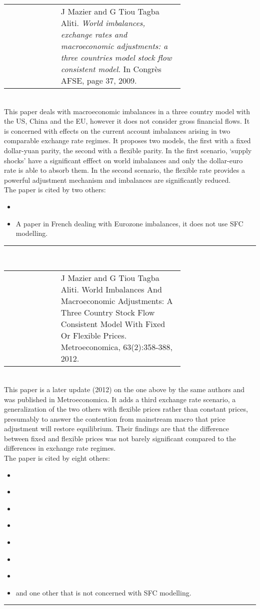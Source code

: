 \documentclass[twoside,a4paper,11pt]{article}
\begin{document}
\begin{tabular}{lp{0.7\linewidth}}
\cite{Mazier2009b} &  J Mazier and G Tiou Tagba Aliti. \textit{World imbalances, exchange
rates and macroeconomic adjustments: a three countries model stock  flow consistent model.} In Congr\`es AFSE, page 37, 2009. 
\end{tabular}\\[5pt]
This paper deals with macroeconomic imbalances in a three country model with the US, China and the EU, however it does not consider gross financial flows. It is concerned with effects on the current account imbalances arising in two comparable exchange rate regimes.  It proposes two models, the first with a fixed dollar-yuan parity, the second with a flexible parity. In the first scenario, `supply shocks' have a significant efffect on world imbalances and only the dollar-euro rate is able to absorb them. In the second scenario, the flexible rate provides a powerful adjustment mechanism and imbalances are significantly reduced.\\
The paper is cited by two others:
\begin{itemize}
\item[] \cite{Lavoie2010a}
\item[] A paper in French dealing with Eurozone imbalances, it does not use SFC modelling.
\end{itemize}
\centering \rule{5cm}{1pt} \\[1cm]

\raggedright \begin{tabular}{lp{0.7\linewidth}}
\cite{Mazier2012b} & J Mazier and G Tiou Tagba Aliti. World Imbalances And Macroeconomic Adjustments:
A Three Country Stock Flow Consistent Model With Fixed Or Flexible Prices.
Metroeconomica, 63(2):358-388, 2012.
\end{tabular}\\[5pt]
This paper is a later update (2012)  on the one above by the same authors and was published in Metroeconomica. It adds a third exchange rate scenario, a generalization of the two others with flexible prices rather than constant prices, presumably to answer the contention from mainstream macro that price adjustment will restore equilibrium. Their findings are that the difference between fixed and flexible prices was not barely significant compared to the differences in exchange rate regimes.\\
The paper is cited by eight others:
\begin{itemize}
\item[] \cite{Caverzasi2013}
\item[] \cite{Caverzasi2014a}
\item[] \cite{Benassy-Quere2013}
\item[] \cite{Mazier2015}
\item[] \cite{Kinsella2012a}
\item[] \cite{Valdecantos2015b}
\item[] \cite{Halporn2012}
\item[] and one other that is not concerned with SFC modelling.
\end{itemize}
\centering \rule{5cm}{1pt}  \\[1cm]
\end{document}
